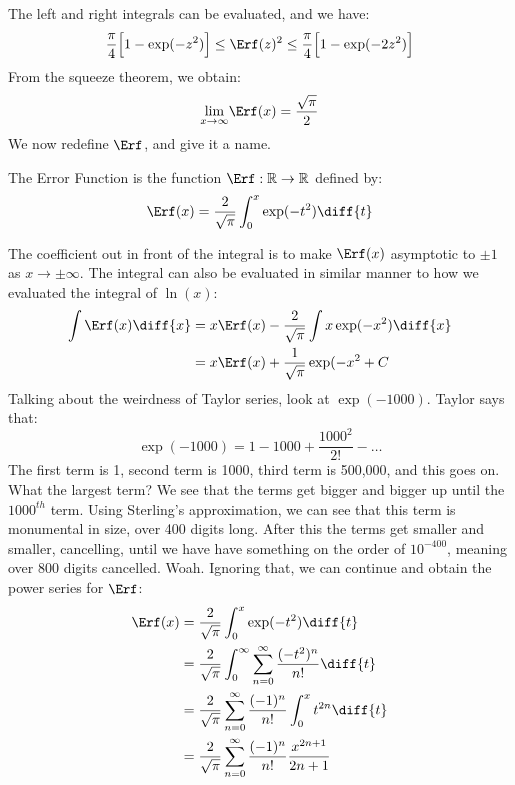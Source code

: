         The left and right integrals can be evaluated, and we
        have:
        \begin{equation}
            \frac{\pi}{4}\Big[1-\exp(-z^{2})\Big]
            \leq\Erf(z)^{2}
            \leq\frac{\pi}{4}\Big[1-\exp(-2z^{2})\Big]
        \end{equation}
        From the squeeze theorem, we obtain:
        \begin{equation}
            \underset{x\rightarrow\infty}{\lim}
            \Erf(x)=\frac{\sqrt{\pi}}{2}
        \end{equation}
        We now redefine $\Erf$, and give it a name.
        \begin{definition}
            The Error Function is the function
            $\Erf:\mathbb{R}\rightarrow\mathbb{R}$ defined by:
            \begin{equation}
                \Erf(x)=\frac{2}{\sqrt{\pi}}
                    \int_{0}^{x}\exp(-t^{2})\diff{t}
            \end{equation}
        \end{definition}
        The coefficient out in front of the integral is to make
        $\Erf(x)$ asymptotic to $\pm{1}$ as $x\rightarrow\pm\infty$.
        The integral can also be evaluated in similar manner to
        how we evaluated the integral of $\ln(x)$:
        \begin{align}
            \int\Erf(x)\diff{x}
            &=x\Erf(x)-\frac{2}{\sqrt{\pi}}
                \int{x}\exp(-x^{2})\diff{x}\\
            &=x\Erf(x)+\frac{1}{\sqrt{\pi}}\exp(-x^{2}+C
        \end{align}
        Talking about the weirdness of Taylor series, look at
        $\exp(-1000)$. Taylor says that:
        \begin{equation}
            \exp(-1000)=1-1000+\frac{1000^{2}}{2!}-\hdots
        \end{equation}
        The first term is 1, second term is 1000, third term
        is 500,000, and this goes on. What the largest term?
        We see that the terms get bigger and bigger up until
        the $1000^{th}$ term. Using Sterling's approximation,
        we can see that this term is monumental in size,
        over 400 digits long. After this the terms get smaller
        and smaller, cancelling, until we have have
        something on the order of $10^{-400}$, meaning over
        800 digits cancelled. Woah. Ignoring that, we can
        continue and obtain the power series for $\Erf$:
        \begin{align}
            \Erf(x)&=\frac{2}{\sqrt{\pi}}
                \int_{0}^{x}\exp(-t^{2})\diff{t}\\
            &=\frac{2}{\sqrt{\pi}}\int_{0}^{\infty}
                \sum_{n=0}^{\infty}\frac{(-t^{2})^{n}}{n!}
                \diff{t}\\
            &=\frac{2}{\sqrt{\pi}}
                \sum_{n=0}^{\infty}\frac{(-1)^{n}}{n!}
                \int_{0}^{x}t^{2n}\diff{t}\\
            &=\frac{2}{\sqrt{\pi}}\sum_{n=0}^{\infty}
                \frac{(-1)^{n}}{n!}\frac{x^{2n+1}}{2n+1}
        \end{align}
